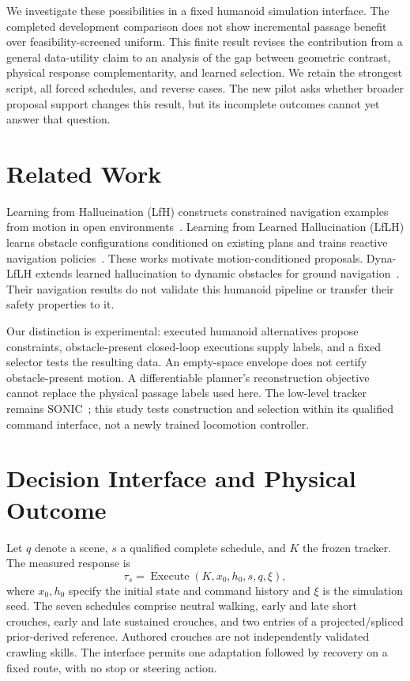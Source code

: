 \documentclass[letterpaper,10pt,conference]{ieeeconf}
\begin{document}
We investigate these possibilities in a fixed humanoid simulation interface.
The completed development comparison does not show incremental passage benefit
over feasibility-screened uniform. This finite result revises the contribution
from a general data-utility claim to an analysis of the gap between geometric
contrast, physical response complementarity, and learned selection. We retain
the strongest script, all forced schedules, and reverse cases. The new pilot
asks whether broader proposal support changes this result, but its incomplete
outcomes cannot yet answer that question.

\section{Related Work}
Learning from Hallucination (LfH) constructs constrained navigation examples
from motion in open environments~\cite{lfh}. Learning from Learned Hallucination
(LfLH) learns obstacle configurations conditioned on existing plans and trains
reactive navigation policies~\cite{lflh}. These works motivate motion-conditioned
proposals. Dyna-LfLH extends learned hallucination to dynamic obstacles for
ground navigation~\cite{dyna}. Their navigation results do not validate this
humanoid pipeline or transfer their safety properties to it.

Our distinction is experimental: executed humanoid alternatives propose
constraints, obstacle-present closed-loop executions supply labels, and a fixed
selector tests the resulting data. An empty-space envelope does not certify
obstacle-present motion. A differentiable planner's reconstruction objective
cannot replace the physical passage labels used here. The low-level tracker
remains SONIC~\cite{sonic}; this study tests construction and selection within
its qualified command interface, not a newly trained locomotion controller.

\section{Decision Interface and Physical Outcome}
Let $q$ denote a scene, $s$ a qualified complete schedule, and $K$ the frozen
tracker. The measured response is
\begin{equation}
 \tau_s=\operatorname{Execute}(K,x_0,h_0,s,q,\xi),
\end{equation}
where $x_0,h_0$ specify the initial state and command history and $\xi$ is the
simulation seed. The seven schedules comprise neutral walking, early and late
short crouches, early and late sustained crouches, and two entries of a
projected/spliced prior-derived reference. Authored crouches are not independently
validated crawling skills. The interface permits one adaptation followed by
recovery on a fixed route, with no stop or steering action.
\end{document}
